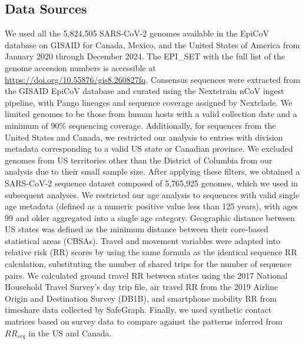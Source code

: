 \documentclass[11pt, letterpaper, oneside]{article}
\begin{document}
\subsection{Data Sources}
We used all the 5,824,505 SARS-CoV-2 genomes available in the EpiCoV database on GISAID for Canada, Mexico, and the United States of America from January 2020 through December 2024.\autocite{elbeDataDiseaseDiplomacy2017,shuGISAIDGlobalInitiative2017,khareGISAIDsRolePandemic2021}
The EPI\_SET with the full list of the genome accession numbers is accessible at \url{https://doi.org/10.55876/gis8.260827fq}.
Consensus sequences were extracted from the GISAID EpiCoV database and curated using the Nextstrain nCoV ingest pipeline,\autocite{hadfieldNextstrainRealtimeTracking2018} with Pango lineages and sequence coverage assigned by Nextclade.\autocite{aksamentovNextcladeCladeAssignment2021}
We limited genomes to be those from human hosts with a valid collection date and a minimum of 90\% sequencing coverage.
Additionally, for sequences from the United States and Canada, we restricted our analysis to entries with division metadata corresponding to a valid US state or Canadian province.
We excluded genomes from US territories other than the District of Columbia from our analysis due to their small sample size.
After applying these filters, we obtained a SARS-CoV-2 sequence dataset composed of 5,765,925 genomes, which we used in subsequent analyses.
We restricted our age analysis to sequences with valid single age metadata (defined as a numeric positive value less than 125 years), with ages 99 and older aggregated into a single age category.
Geographic distance between US states was defined as the minimum distance between their core-based statistical areas (CBSAs).\autocite{bureauMetropolitanMicropolitanStatistical}
Travel and movement variables were adapted into relative risk (RR) scores by using the same formula as the identical sequence RR calculation, substituting the number of shared trips for the number of sequence pairs.\autocite{tran-kiemFinescalePatternsSARSCoV22025a}
We calculated ground travel RR between states using the 2017 National Household Travel Survey's day trip file, air travel RR from the 2019 Airline Origin and Destination Survey (DB1B), and smartphone mobility RR from timeshare data collected by SafeGraph.\autocite{NationalHouseholdTravel,DB1B_Dataset,pullanoCharacterizingUSSpatial2025}
Finally, we used synthetic contact matrices based on survey data to compare against the patterns inferred from $RR_{seq}$ in the US and Canada.\autocite{mistryInferringHighresolutionHuman2021}
\end{document}
